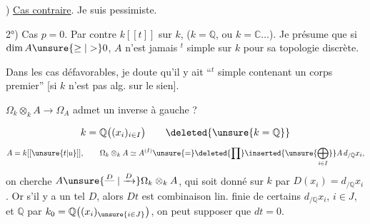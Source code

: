 
) \uline{Cas contraire}. Je suis pessimiste.

2°) Cas $p=0$. Par contre $k[[t]]$ sur $k$,
($k=\mathbb Q$, ou $k=\mathbb C\ldots$). Je présume que
si $\dim A\unsure{\geq|>}0$, $A$ n'est jamais $^t$ simple
sur $k$ pour sa topologie discrète.

Dans les cas défavorables, je doute qu'il
y ait  ``$^t$ simple contenant un corps
premier'' [si $k$ n'est pas alg. sur le sien].

$\Omega_k\otimes_k A\longrightarrow\Omega_A$
admet un inverse à gauche ?

\[
k=\mathbb Q\bigl((x_i)_{i\in I}\bigr)
\qquad \deleted{\unsure{k=\mathbb Q}}
\]
\[
A=k[[\unsure{t|u}]],\qquad
\Omega_k\otimes_k A\simeq A^{(I)}
\unsure{=}\deleted{\prod}\inserted{\unsure{\bigoplus_{i\in I}}}
A\,d_{/\mathbb Q}x_i,
\]
on cherche $A\unsure{\mathrel{\overset{D}{\text{---}}}|\xrightarrow{D}}\Omega_k\otimes_k A$, qui soit
donné sur $k$ par $D(x_i)=d_{/\mathbb Q}x_i$.
Or s'il y a un tel $D$, alors $Dt$ est combinaison lin.
finie de certains $d_{/\mathbb Q}x_i$, $i\in J$, et 
$\mathbb Q$ par $k_0=\mathbb Q\bigl((x_i)_{\unsure{i\in J}}\bigr)$,
on peut supposer que
$dt=0$.

